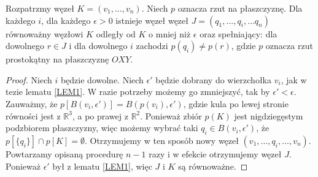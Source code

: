 \begin{lemat}
 \label{LEM2}
 Rozpatrzmy węzeł $K = (v_1, \ldots, v_n)$. Niech $p$ oznacza rzut na płaszczyznę. Dla każdego $i$, dla każdego $\epsilon > 0$ istnieje węzeł
 węzeł $J = (q_1, \ldots, q_i, \ldots q_n)$ równoważny węzłowi $K$ odległy od $K$ o mniej niż $\epsilon$ oraz spełniający:
 dla dowolnego $r\in J$ i dla dowolnego $i$ zachodzi $p(q_i)\neq p(r)$, gdzie $p$ oznacza rzut prostokątny na płaszczyznę $OXY$.
\end{lemat}
 \begin{proof}
  Niech $i$ będzie dowolne. 
  Niech $\epsilon'$ będzie dobrany do wierzchołka $v_i$, jak w tezie lematu \ref{LEM1}. W razie potrzeby możemy go zmniejszyć, tak by $\epsilon'<\epsilon$. 
  Zauważmy, że $p[B(v_i, \epsilon')] = B(p(v_i),\epsilon')$, gdzie kula po lewej stronie równości jest z $\mathbb{R}^3$, a po prawej z $\mathbb{R}^2$. Ponieważ zbiór $p(K)$ jest nigdziegęstym podzbiorem płaszczyzny, więc możemy wybrać taki $q_i\in B(v_i, \epsilon')$,
  że $p[\lbrace q_i\rbrace]\cap p[K] = \emptyset$. Otrzymujemy w ten sposób nowy węzeł $(v_1, \ldots, q_i, \ldots, v_n)$. Powtarzamy opisaną procedurę $n-1$ razy i w efekcie 
  otrzymujemy węzeł $J$. Ponieważ $\epsilon'$ był z lematu \ref{LEM1}, więc $J$ i $K$ są równoważne. 
 \end{proof}


